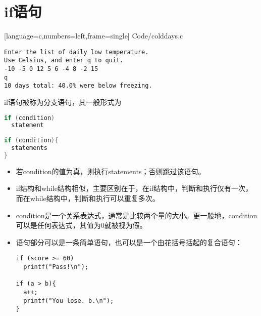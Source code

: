 \section{if语句}

\begin{frame}\ft{\secname}

[language=c,numbers=left,frame=single]
{Code/colddays.c}
\end{frame}


\begin{frame}[fragile]\ft{\secname}
\begin{lstlisting}[backgroundcolor=\color{red!10}]
Enter the list of daily low temperature.
Use Celsius, and enter q to quit.
-10 -5 0 12 5 6 -4 8 -2 15
q
10 days total: 40.0% were below freezing.
\end{lstlisting}
\end{frame}

\begin{frame}[fragile]\ft{\secname}
if语句被称为分支语句，其一般形式为
\begin{lstlisting}[language=c]
if (condition)
  statement
  
if (condition){
  statements
}  
\end{lstlisting}
\begin{itemize}
\item
若condition的值为真，则执行statements；否则跳过该语句。\\[0.1in]
\item
if结构和while结构相似，主要区别在于，在if结构中，判断和执行仅有一次，而在while结构中，判断和执行可以重复多次。
\end{itemize}
\end{frame}

\begin{frame}[fragile]\ft{\secname}
\begin{itemize}
\item
condition是一个关系表达式，通常是比较两个量的大小。更一般地，condition可以是任何表达式，其值为0就被视为假。\\[0.1in]
\item
语句部分可以是一条简单语句，也可以是一个由花括号括起的复合语句：
\begin{lstlisting}[]
if (score >= 60)
  printf("Pass!\n");
  
if (a > b){
  a++;
  printf("You lose. b.\n");
}  
\end{lstlisting}
\end{itemize}

\end{frame}

